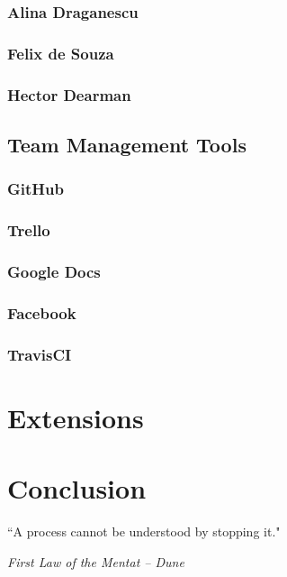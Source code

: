 \documentclass[11pt, a4paper]{article}
\newlength\longest
\begin{document}
\subsubsection{Alina Draganescu}
\subsubsection{Felix de Souza}
\subsubsection{Hector Dearman}
\subsection{Team Management Tools}
\subsubsection{GitHub}
\subsubsection{Trello}
\subsubsection{Google Docs}
\subsubsection{Facebook}
\subsubsection{TravisCI}


\section{Extensions}
\section{Conclusion}

\clearpage
\thispagestyle{empty}
\null\vfill
\begin{center}
\settowidth{}
\parbox{\longest}{%
  \raggedright{%
  ``A process cannot be understood by stopping it." \\
  }   
  \raggedright{\emph{First Law of the Mentat -- Dune}}\par%
}
\end{center}
\vfill\vfill
\clearpage
\end{document}
